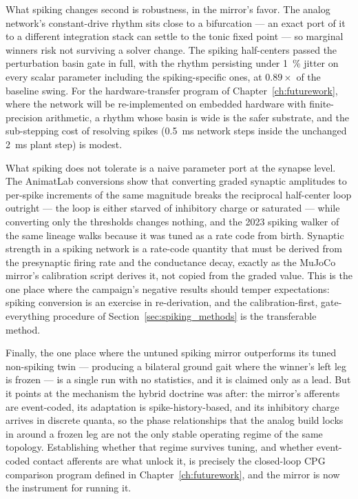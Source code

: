 What spiking changes second is robustness, in the mirror's favor. The analog network's constant-drive rhythm sits close to a bifurcation --- an exact port of it to a different integration stack can settle to the tonic fixed point --- so marginal winners risk not surviving a solver change. The spiking half-centers passed the perturbation basin gate in full, with the rhythm persisting under \qty{1}{\percent} jitter on every scalar parameter including the spiking-specific ones, at $0.89\times$ of the baseline swing. For the hardware-transfer program of Chapter~\ref{ch:futurework}, where the network will be re-implemented on embedded hardware with finite-precision arithmetic, a rhythm whose basin is wide is the safer substrate, and the sub-stepping cost of resolving spikes (\qty{0.5}{\milli\second} network steps inside the unchanged \qty{2}{\milli\second} plant step) is modest.

What spiking does not tolerate is a naive parameter port at the synapse level. The AnimatLab conversions show that converting graded synaptic amplitudes to per-spike increments of the same magnitude breaks the reciprocal half-center loop outright --- the loop is either starved of inhibitory charge or saturated --- while converting only the thresholds changes nothing, and the 2023 spiking walker of the same lineage walks because it was tuned as a rate code from birth. Synaptic strength in a spiking network is a rate-code quantity that must be derived from the presynaptic firing rate and the conductance decay, exactly as the MuJoCo mirror's calibration script derives it, not copied from the graded value. This is the one place where the campaign's negative results should temper expectations: spiking conversion is an exercise in re-derivation, and the calibration-first, gate-everything procedure of Section~\ref{sec:spiking_methods} is the transferable method.

Finally, the one place where the untuned spiking mirror outperforms its tuned non-spiking twin --- producing a bilateral ground gait where the winner's left leg is frozen --- is a single run with no statistics, and it is claimed only as a lead. But it points at the mechanism the hybrid doctrine was after: the mirror's afferents are event-coded, its adaptation is spike-history-based, and its inhibitory charge arrives in discrete quanta, so the phase relationships that the analog build locks in around a frozen leg are not the only stable operating regime of the same topology. Establishing whether that regime survives tuning, and whether event-coded contact afferents are what unlock it, is precisely the closed-loop CPG comparison program defined in Chapter~\ref{ch:futurework}, and the mirror is now the instrument for running it.

